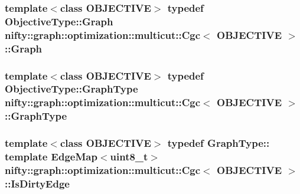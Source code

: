 \subsubsection[{Graph}]{\setlength{\rightskip}{0pt plus 5cm}template$<$class O\+B\+J\+E\+C\+T\+I\+V\+E$>$ typedef Objective\+Type\+::\+Graph {\bf nifty\+::graph\+::optimization\+::multicut\+::\+Cgc}$<$ O\+B\+J\+E\+C\+T\+I\+V\+E $>$\+::{\bf Graph}}\label{classnifty_1_1graph_1_1optimization_1_1multicut_1_1Cgc_a4737d533c9d4d62c220bb81f5acba0fe}
\hypertarget{classnifty_1_1graph_1_1optimization_1_1multicut_1_1Cgc_a7954c621d6b0085dac0a0208e8edeb98}{}
\subsubsection[{Graph\+Type}]{\setlength{\rightskip}{0pt plus 5cm}template$<$class O\+B\+J\+E\+C\+T\+I\+V\+E$>$ typedef Objective\+Type\+::\+Graph\+Type {\bf nifty\+::graph\+::optimization\+::multicut\+::\+Cgc}$<$ O\+B\+J\+E\+C\+T\+I\+V\+E $>$\+::{\bf Graph\+Type}}\label{classnifty_1_1graph_1_1optimization_1_1multicut_1_1Cgc_a7954c621d6b0085dac0a0208e8edeb98}
\hypertarget{classnifty_1_1graph_1_1optimization_1_1multicut_1_1Cgc_a9aab1ca56069c4f2801a35bf05620465}{}
\subsubsection[{Is\+Dirty\+Edge}]{\setlength{\rightskip}{0pt plus 5cm}template$<$class O\+B\+J\+E\+C\+T\+I\+V\+E$>$ typedef Graph\+Type\+:: template Edge\+Map$<$uint8\+\_\+t$>$ {\bf nifty\+::graph\+::optimization\+::multicut\+::\+Cgc}$<$ O\+B\+J\+E\+C\+T\+I\+V\+E $>$\+::{\bf Is\+Dirty\+Edge}}\label{classnifty_1_1graph_1_1optimization_1_1multicut_1_1Cgc_a9aab1ca56069c4f2801a35bf05620465}
\hypertarget{classnifty_1_1graph_1_1optimization_1_1multicut_1_1Cgc_acc73bcc6196a77bd128d62999de28181}{}
